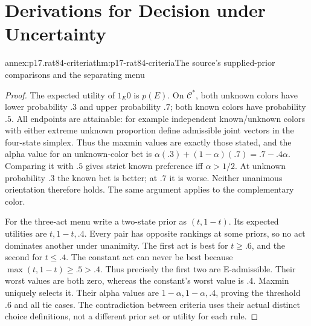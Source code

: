 \chapter{Derivations for Decision under Uncertainty}
\label{annex:p17-rationality-8-4}

\begin{annexitem}{annex:p17.rat84-criteria}{thm:p17-rat84-criteria}{The source's supplied-prior comparisons and the separating menu}
\begin{proof}
The expected utility of \(1_E0\) is \(p(E)\). On
\(\mathcal C^*\), both unknown colors have lower probability
\(.3\) and upper probability \(.7\); both known colors have
probability \(.5\). All endpoints are attainable: for example
independent known/unknown colors with either extreme unknown
proportion define admissible joint vectors in the four-state simplex.
Thus the maxmin values are exactly those stated, and the alpha value
for an unknown-color bet is
\(\alpha(.3)+(1-\alpha)(.7)=.7-.4\alpha\).
Comparing it with \(.5\) gives strict known preference iff
\(\alpha>1/2\). At unknown probability \(.3\) the known bet
is better; at \(.7\) it is worse. Neither unanimous orientation
therefore holds. The same argument applies to the complementary color.

For the three-act menu write a two-state prior as \((t,1-t)\).
Its expected utilities are \(t,1-t,.4\). Every pair has opposite
rankings at some priors, so no act dominates another under unanimity.
The first act is best for \(t\geq.6\), and the second for
\(t\leq.4\). The constant act can never be best because
\(\max(t,1-t)\geq.5>.4\). Thus precisely the first two are
E-admissible. Their worst values are both zero, whereas the
constant's worst value is \(.4\). Maxmin uniquely selects it.
Their alpha values are \(1-\alpha,1-\alpha,.4\), proving
the threshold \(.6\) and all tie cases. The contradiction
between criteria uses their actual distinct choice definitions,
not a different prior set or utility for each rule.
\end{proof}
\end{annexitem}

